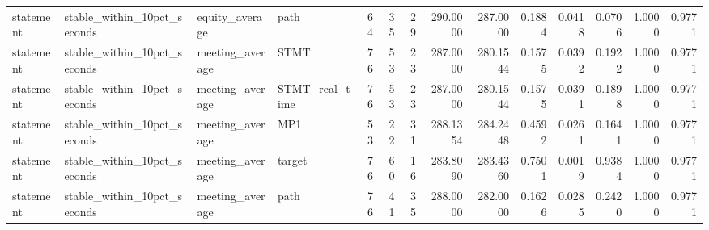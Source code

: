 \begin{tabular}{llllrrrrrrrrrr}
statement & stable_within_10pct_seconds & equity_average & path & 64 & 35 & 29 & 290.0000 & 287.0000 & 0.1884 & 0.0418 & 0.0706 & 1.0000 & 0.9771 \\
statement & stable_within_10pct_seconds & meeting_average & STMT & 76 & 53 & 23 & 287.0000 & 280.1544 & 0.1575 & 0.0392 & 0.1922 & 1.0000 & 0.9771 \\
statement & stable_within_10pct_seconds & meeting_average & STMT_real_time & 76 & 53 & 23 & 287.0000 & 280.1544 & 0.1575 & 0.0391 & 0.1898 & 1.0000 & 0.9771 \\
statement & stable_within_10pct_seconds & meeting_average & MP1 & 53 & 22 & 31 & 288.1354 & 284.2448 & 0.4592 & 0.0261 & 0.1641 & 1.0000 & 0.9771 \\
statement & stable_within_10pct_seconds & meeting_average & target & 76 & 60 & 16 & 283.8090 & 283.4360 & 0.7501 & 0.0019 & 0.9384 & 1.0000 & 0.9771 \\
statement & stable_within_10pct_seconds & meeting_average & path & 76 & 41 & 35 & 288.0000 & 282.0000 & 0.1626 & 0.0285 & 0.2420 & 1.0000 & 0.9771 \\
\bottomrule
\end{tabular}
